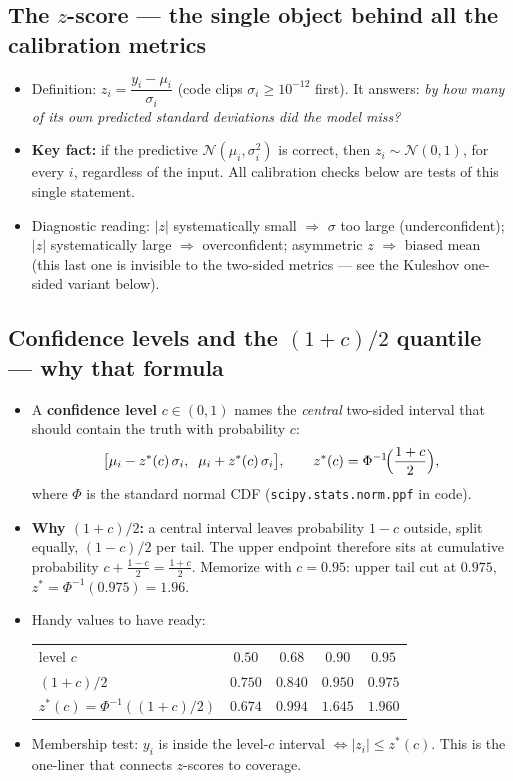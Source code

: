 \documentclass[10pt,a4paper]{article}
\newcommand{\code}[1]{\texttt{#1}}
\begin{document}
\subsection{The $z$-score --- the single object behind all the calibration metrics}
\begin{itemize}
\item Definition: $z_i=\dfrac{y_i-\mu_i}{\sigma_i}$ (code clips $\sigma_i\ge10^{-12}$ first).
  It answers: \emph{by how many of its own predicted standard deviations did the model miss?}
\item \textbf{Key fact:} if the predictive $\mathcal{N}(\mu_i,\sigma_i^2)$ is correct, then
  $z_i\sim\mathcal{N}(0,1)$, for every $i$, regardless of the input. All calibration checks below
  are tests of this single statement.
\item Diagnostic reading: $|z|$ systematically small $\Rightarrow$ $\sigma$ too large
  (underconfident); $|z|$ systematically large $\Rightarrow$ overconfident; asymmetric $z$
  $\Rightarrow$ biased mean (this last one is invisible to the two-sided metrics --- see the
  Kuleshov one-sided variant below).
\end{itemize}

\subsection{Confidence levels and the $(1+c)/2$ quantile --- why that formula}
\begin{itemize}
\item A \textbf{confidence level} $c\in(0,1)$ names the \emph{central} two-sided interval that
  should contain the truth with probability $c$:
  \[
  \bigl[\mu_i - z^*(c)\,\sigma_i,\;\; \mu_i + z^*(c)\,\sigma_i\bigr],
  \qquad z^*(c)=\Phi^{-1}\!\Bigl(\frac{1+c}{2}\Bigr),
  \]
  where $\Phi$ is the standard normal CDF (\code{scipy.stats.norm.ppf} in code).
\item \textbf{Why $(1+c)/2$:} a central interval leaves probability $1-c$ outside, split equally,
  $(1-c)/2$ per tail. The upper endpoint therefore sits at cumulative probability
  $c+\frac{1-c}{2}=\frac{1+c}{2}$. Memorize with $c=0.95$: upper tail cut at $0.975$,
  $z^*=\Phi^{-1}(0.975)=1.96$.
\item Handy values to have ready:
  \begin{center}\small
  \begin{tabular}{lcccc}
  \toprule
  level $c$ & $0.50$ & $0.68$ & $0.90$ & $0.95$\\
  $(1+c)/2$ & $0.750$ & $0.840$ & $0.950$ & $0.975$\\
  $z^*(c)=\Phi^{-1}((1{+}c)/2)$ & $0.674$ & $0.994$ & $1.645$ & $1.960$\\
  \bottomrule
  \end{tabular}
  \end{center}
\item Membership test: $y_i$ is inside the level-$c$ interval $\iff |z_i|\le z^*(c)$. This is the
  one-liner that connects $z$-scores to coverage.
\end{itemize}
\end{document}
